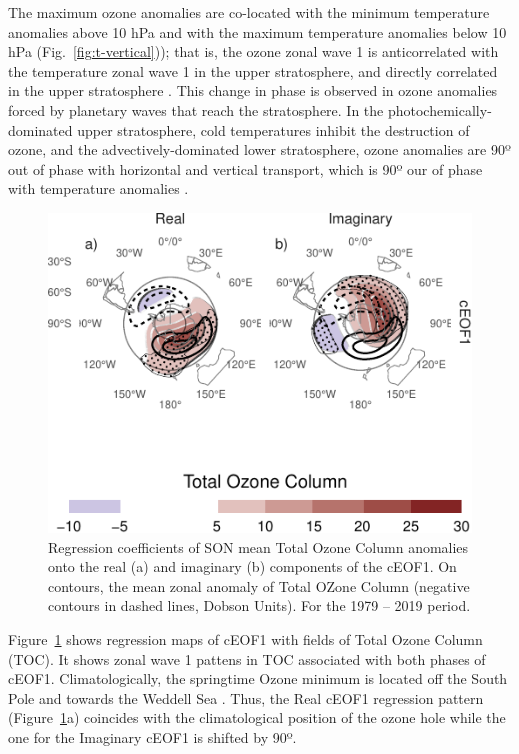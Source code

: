 \documentclass[smallextended]{svjour3}       %
\begin{document}
The maximum ozone anomalies are co-located with the minimum temperature anomalies above 10 hPa and with the maximum temperature anomalies below 10 hPa (Fig.~\ref{fig:t-vertical})); that is, the ozone zonal wave 1 is anticorrelated with the temperature zonal wave 1 in the upper stratosphere, and directly correlated in the upper stratosphere . This change in phase is observed in ozone anomalies forced by planetary waves that reach the stratosphere. In the photochemically-dominated upper stratosphere, cold temperatures inhibit the destruction of ozone, and the advectively-dominated lower stratosphere, ozone anomalies are 90º out of phase with horizontal and vertical transport, which is 90º our of phase with temperature anomalies \citep{hartmann1979, wirth1993, smith1995}.



\begin{figure}
\centering
\includegraphics{../figures/o3-regr-1.pdf}
\caption{\label{fig:o3-regr}Regression coefficients of SON mean Total Ozone Column anomalies onto the real (a) and imaginary (b) components of the cEOF1. On contours, the mean zonal anomaly of Total OZone Column (negative contours in dashed lines, Dobson Units). For the 1979 -- 2019 period.}
\end{figure}

Figure~\ref{fig:o3-regr} shows regression maps of cEOF1 with fields of Total Ozone Column (TOC). It shows zonal wave 1 pattens in TOC associated with both phases of cEOF1. Climatologically, the springtime Ozone minimum is located off the South Pole and towards the Weddell Sea \citep{wirth1993}. Thus, the Real cEOF1 regression pattern (Figure~\ref{fig:o3-regr}a) coincides with the climatological position of the ozone hole while the one for the Imaginary cEOF1 is shifted by 90º.
\end{document}
